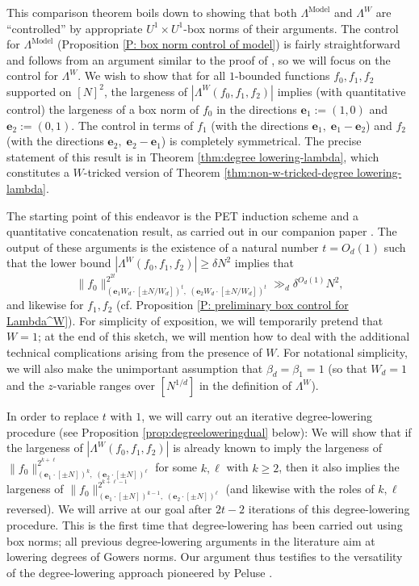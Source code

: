 \documentclass[11pt]{amsart}
\theoremstyle{definition}
\newcommand{\be}{{\mathbf{e}}}
\newcommand{\model}{{\mathrm{Model}}}
\begin{document}
This comparison theorem boils down to showing that both $\Lambda^{\model}$ and $\Lambda^W$ are ``controlled'' by appropriate $U^1 \times U^1$-box norms of their arguments.  The control for $\Lambda^{\model}$ (Proposition \ref{P: box norm control of model}) is fairly straightforward and follows from an argument similar to the proof of \cite[Lemma 4.1]{PSS23}, so we will focus on the control for $\Lambda^W$.  We wish to show that for all $1$-bounded functions $f_0,f_1,f_2$ supported on $[N]^2$, the largeness of $|\Lambda^W(f_0,f_1,f_2)|$ implies (with quantitative control) the largeness of a box norm of $f_0$ in the directions $\be_1:=(1,0)$ and $\be_2:=(0,1)$.  The control in terms of $f_1$ 
(with the directions $\be_1,\; \be_1-\be_2$) and $f_2$ (with the directions $\be_2,\; \be_2-\be_1$) is completely symmetrical. The precise statement of this result is in Theorem \ref{thm:degree lowering-lambda}, which constitutes a $W$-tricked version of Theorem \ref{thm:non-w-tricked-degree lowering-lambda}.

The starting point of this endeavor is the PET induction scheme and a quantitative concatenation result, as carried out in our companion paper \cite{KKL24a}.  The output of these arguments is the existence of a natural number $t=O_d(1)$ such that the lower bound $|\Lambda^W(f_0,f_1,f_2)| \geq \delta N^2$ implies that
\begin{equation}\label{eq:PET-output-sketch}
\|f_0\|_{(\be_1 W_d\cdot [\pm N/W_d])^t,\; (\be_2 W_d\cdot [\pm N/W_d])^t}^{2^{2t}}\gg_d \delta^{O_d(1)} N^2,
\end{equation}
and likewise for $f_1,f_2$ (cf. Proposition \ref{P: preliminary box control for Lambda^W}).  
For simplicity of exposition, we will temporarily pretend that $W=1$; at the end of this sketch, we will mention how to deal with the additional technical complications arising from the presence of $W$.  For notational simplicity, we will also make the unimportant assumption that $\beta_d=\beta_1=1$ (so that $W_d = 1$ and the $z$-variable ranges over $[N^{1/d}]$ in the definition of $\Lambda^W$).  

In order to replace $t$ with $1$, we will carry out an iterative degree-lowering procedure (see Proposition \ref{prop:degreeloweringdual} below): We will show that if the largeness of $|\Lambda^W(f_0,f_1,f_2)|$ is already known to imply the largeness of $\|f_0\|_{(\be_1\cdot [\pm N])^k,\; (\be_2\cdot [\pm N])^\ell}^{2^{k+\ell}}$ for some $k,\ell$ with $k \geq 2$, then it also implies the largeness of $\|f_0\|_{(\be_1\cdot [\pm N])^{k-1},\; (\be_2\cdot [\pm N])^\ell}^{2^{k+\ell-1}}$ (and likewise with the roles of $k,\ell$ reversed).  We will arrive at our goal after $2t-2$ iterations of this degree-lowering procedure. This is the first time that degree-lowering has been carried out using box norms; all previous degree-lowering arguments in the literature aim at lowering degrees of Gowers norms. Our argument thus testifies to the versatility of the degree-lowering approach pioneered by Peluse \cite{Pel19}.
\end{document}
